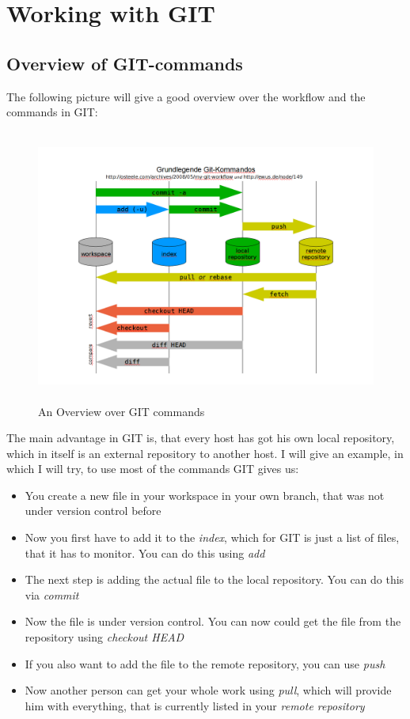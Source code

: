 \section{Working with GIT}

\subsection{Overview of GIT-commands}

The following picture will give a good overview over the workflow and the commands in GIT:\\
\begin{figure}[h!]
 \begin{center}
  \includegraphics[width=12cm,height=9cm]{./Pics/git.png}
 \end{center}
 \caption{An Overview over GIT commands}
\end{figure}
The main advantage in GIT is, that every host has got his own local repository, which in itself is an external repository to another host.\newpage 
I will give an example, in which I will try, to use most of the commands GIT gives us:
\begin{itemize}
 \item You create a new file in your workspace in your own branch, that was not under version control before
 \item Now you first have to add it to the \emph{index}, which for GIT is just a list of files, that it has to monitor. You can do this using \emph{add}
 \item The next step is adding the actual file to the local repository. You can do this via \emph{commit}
 \item Now the file is under version control. You can now could get the file from the repository using \emph{checkout HEAD}
 \item If you also want to add the file to the remote repository, you can use \emph{push}
 \item Now another person can get your whole work using \emph{pull}, which will provide him with everything, that is currently listed in your \emph{remote repository}
\end{itemize}
